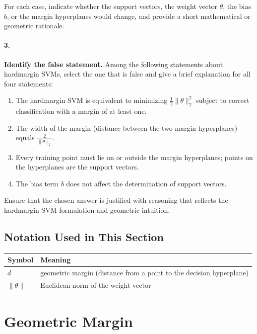 \documentclass[12pt, a4paper]{article}
\begin{document}
For each case, indicate whether the support vectors, the weight vector \(\theta\), the bias \(b\), or the margin hyperplanes would change, and provide a short mathematical or geometric rationale.

\newpage
\paragraph{3.} \textbf{Identify the false statement.}  
Among the following statements about hardmargin SVMs, select the one that is false and give a brief explanation for all four statements:

\begin{enumerate}
\item The hardmargin SVM is equivalent to minimizing \(\frac{1}{2}\|\theta\|_{2}^{2}\) subject to correct classification with a margin of at least one.  
\item The width of the margin (distance between the two margin hyperplanes) equals \(\frac{2}{\|\theta\|_{2}}\).  
\item Every training point must lie on or outside the margin hyperplanes; points on the hyperplanes are the support vectors.  
\item The bias term \(b\) does not affect the determination of support vectors.
\end{enumerate}

Ensure that the chosen answer is justified with reasoning that reflects the hardmargin SVM formulation and geometric intuition.   \newpage

\newpage

\subsection*{Notation Used in This Section}
\begin{tabular}{@{}ll@{}}
\toprule
Symbol & Meaning \\ \midrule
    $d$ & geometric margin (distance from a point to the decision hyperplane) \\
    $\|\theta\|$ & Euclidean norm of the weight vector \\
\bottomrule
\end{tabular}
\vspace{1em}

\section{Geometric Margin}
\end{document}
